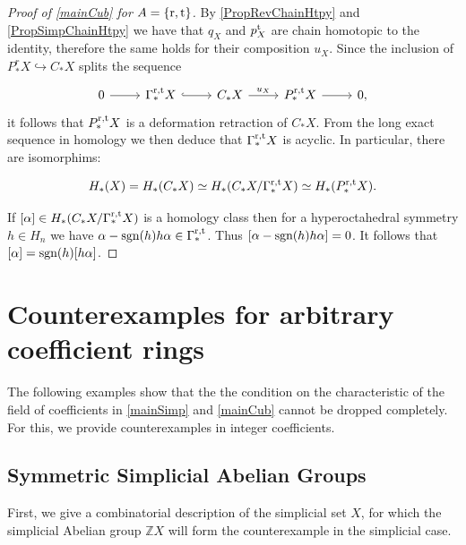 \documentclass[12pt]{amsart}
\theoremstyle{plain}
\numberwithin{lemma}{\DefaultNumberTheoremWithin}
\numberwithin{claim}{\DefaultNumberTheoremWithin}
\numberwithin{theorem}{\DefaultNumberTheoremWithin}
\numberwithin{corollary}{\DefaultNumberTheoremWithin}
\numberwithin{proposition}{\DefaultNumberTheoremWithin}
\numberwithin{conjecture}{\DefaultNumberTheoremWithin}
\theoremstyle{definition}
\theoremstyle{definition}
\numberwithin{question}{\DefaultNumberTheoremWithin}
\theoremstyle{definition}
\numberwithin{problem}{\DefaultNumberTheoremWithin}
\theoremstyle{remark}
\numberwithin{remark}{\DefaultNumberTheoremWithin}
\theoremstyle{remark}
\numberwithin{example}{\DefaultNumberTheoremWithin}
\def\blt{*}
\def\sgn{\textnormal{sgn}}
\def\rev{\textnormal{r}}
\def\trp{\textnormal{t}}
\def\pirev{q}
\def\Con{\mathrm{\Gamma}}  %
\def\rtCon{\Con^{\rev,\trp}} %
\def\pitr{u}
\begin{document}
\begin{proof}[Proof of \ref{mainCub} for $A=\{\rev,\trp\}$]
    By \ref{PropRevChainHtpy} and \ref{PropSimpChainHtpy} we have that $\pirev_X$ and $p^{\trp}_X$ are  
    chain homotopic to the identity, therefore the same holds for their composition $\pitr_X$. Since the inclusion of $P^r_\blt X \hookrightarrow C_\blt X$ 
    splits the sequence
    \[
    \begin{tikzcd}
    0\arrow{r}{}&\rtCon_\blt X\arrow[hook]{r}{} &C_\blt X\arrow{r}{\pitr_X}&P^{\rev,\trp}_\blt X \arrow{r}&0,
    \end{tikzcd}
    \]
    it follows that $P^{\rev,\trp}_\blt X$ is a deformation 
    retraction of $C_\blt X$. From the long exact 
    sequence in homology we then deduce
    that $\rtCon_\blt X$ is acyclic.
    In particular, there are isomorphims:

    \[
    H_\blt (X) = H_\blt(C_\blt X) \simeq H_\blt (C_\blt X /\rtCon_\blt X ) \simeq H_\blt(P^{\rev,\trp}_\blt X).
    \]

    If $[\alpha] \in H_\blt (C_\blt X /\rtCon_\blt X )$ is a homology class then
    for a hyperoctahedral symmetry $h\in H_n$ we have $\alpha-\sgn(h) h\alpha \in \rtCon_\blt$. Thus
    $[\alpha-\sgn(h) h\alpha] = 0$. It follows that $[\alpha] = \sgn(h)[h\alpha]$.
    
\end{proof}

\section{Counterexamples for arbitrary coefficient rings} \label{sec:counter}

The following examples show that the 
the condition on the characteristic of the field of coefficients in \ref{mainSimp}
and \ref{mainCub} cannot be dropped
completely. For this, we provide counterexamples in integer coefficients.

\subsection{Symmetric Simplicial Abelian Groups} \label{subsec:ssag}


First, we give a combinatorial description of the simplicial 
set $X$, for which the simplicial Abelian group $\mathbb{Z}X$ will form the counterexample in the simplicial case.
\end{document}
